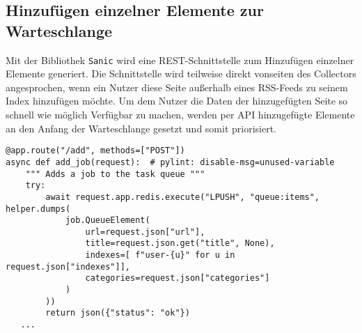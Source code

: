 \subsection{Hinzufügen einzelner Elemente zur Warteschlange}
Mit der Bibliothek \texttt{Sanic} wird eine REST-Schnittstelle zum Hinzufügen einzelner Elemente generiert.
Die Schnittstelle wird teilweise direkt vonseiten des Collectors angesprochen, wenn ein Nutzer diese Seite außerhalb eines RSS-Feeds zu seinem Index hinzufügen möchte.
Um dem Nutzer die Daten der hinzugefügten Seite so schnell wie möglich Verfügbar zu machen, werden per API hinzugefügte Elemente an den Anfang der Warteschlange gesetzt und somit priorisiert.
\begin{verbatim}
@app.route("/add", methods=["POST"])
async def add_job(request):  # pylint: disable-msg=unused-variable
    """ Adds a job to the task queue """
    try:
        await request.app.redis.execute("LPUSH", "queue:items", helper.dumps(
            job.QueueElement(
                url=request.json["url"],
                title=request.json.get("title", None),
                indexes=[ f"user-{u}" for u in request.json["indexes"]],
                categories=request.json["categories"]
            )
        ))
        return json({"status": "ok"})
   ...
\end{verbatim}
